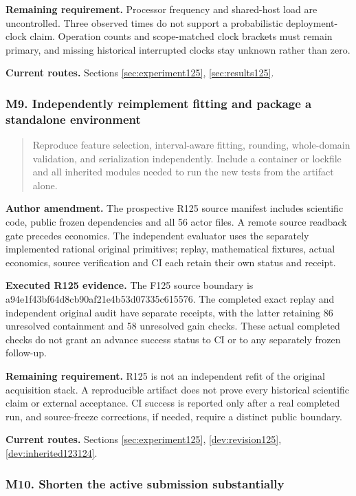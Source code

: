 \noindent\textbf{Remaining requirement.} Processor frequency and shared-host load are uncontrolled. Three observed times do not support a probabilistic deployment-clock claim. Operation counts and scope-matched clock brackets must remain primary, and missing historical interrupted clocks stay unknown rather than zero.

\noindent\textbf{Current routes.} Sections \ref{sec:experiment125}, \ref{sec:results125}.

\subsubsection{M9. Independently reimplement fitting and package a standalone environment}

\begin{quote}\small
Reproduce feature selection, interval-aware fitting, rounding, whole-domain validation, and serialization independently. Include a container or lockfile and all inherited modules needed to run the new tests from the artifact alone.
\end{quote}

\noindent\textbf{Author amendment.} The prospective R125 source manifest includes scientific code, public frozen dependencies and all 56 actor files. A remote source readback gate precedes economics. The independent evaluator uses the separately implemented rational original primitives; replay, mathematical fixtures, actual economics, source verification and CI each retain their own status and receipt.

\noindent\textbf{Executed R125 evidence.} The F125 source boundary is a94e1f43bf64d8cb90af21e4b53d07335c615576. The completed exact replay and independent original audit have separate receipts, with the latter retaining 86 unresolved containment and 58 unresolved gain checks. These actual completed checks do not grant an advance success status to CI or to any separately frozen follow-up.

\noindent\textbf{Remaining requirement.} R125 is not an independent refit of the original acquisition stack. A reproducible artifact does not prove every historical scientific claim or external acceptance. CI success is reported only after a real completed run, and source-freeze corrections, if needed, require a distinct public boundary.

\noindent\textbf{Current routes.} Sections \ref{sec:experiment125}, \ref{dev:revision125}, \ref{dev:inherited123124}.

\subsubsection{M10. Shorten the active submission substantially}

